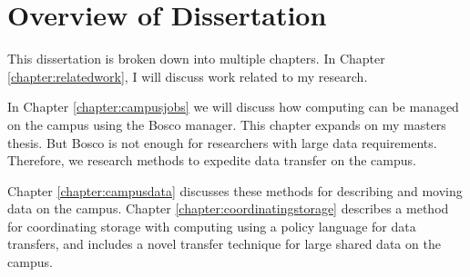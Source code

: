 \section{Overview of Dissertation}

This dissertation is broken down into multiple chapters.  In Chapter \ref{chapter:relatedwork}, I will discuss work related to my research.  

In Chapter \ref{chapter:campusjobs} we will discuss how computing can be managed on the campus using the Bosco manager.  This chapter expands on my masters thesis.  But Bosco is not enough for researchers with large data requirements.  Therefore, we research methods to expedite data transfer on the campus.   

Chapter \ref{chapter:campusdata} discusses these methods for describing and moving data on the campus.  Chapter \ref{chapter:coordinatingstorage} describes a method for coordinating storage with computing using a policy language for data transfers, and includes a novel transfer technique for large shared data on the campus.




